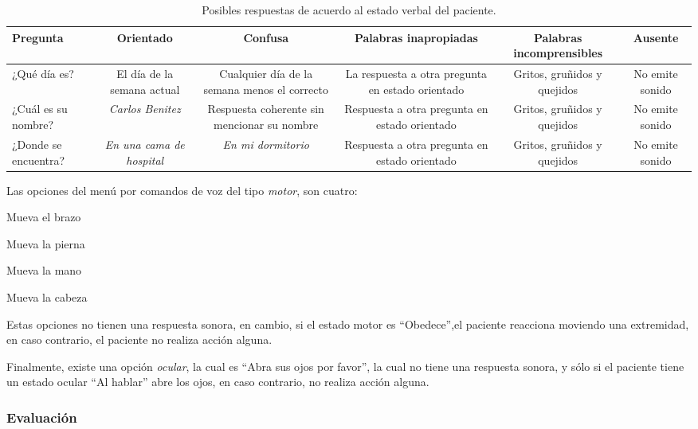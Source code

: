 \begin{itemize}
\begin{table}[H]
\centering
\begin{tabulary}{\textwidth}{LCCCCC}
\toprule
\textbf{Pregunta} & \textbf{Orientado} & \textbf{Confusa} & \textbf{Palabras
    inapropiadas} & \textbf{Palabras incomprensibles} & \textbf{Ausente} \\
\midrule
¿Qué día es? & El día de la semana actual & Cualquier día de la semana menos el
correcto & La respuesta a otra pregunta en estado orientado & Gritos, gruñidos y
quejidos & No emite sonido \\
¿Cuál es su nombre? & \emph{Carlos Benitez} & Respuesta coherente sin mencionar
su nombre & Respuesta a otra pregunta en estado orientado & Gritos, gruñidos y
quejidos & No emite sonido \\
¿Donde se encuentra? & \emph{En una cama de hospital} & \emph{En mi dormitorio} &
Respuesta a otra pregunta en estado orientado & Gritos, gruñidos y quejidos & No
emite sonido \\
\bottomrule
\end{tabulary}
\caption{Posibles respuestas de acuerdo al estado verbal del paciente.}
\label{tab:glasgow_opciones_respuesta}
\end{table}

Las opciones del menú por comandos de voz del tipo \emph{motor}, son cuatro: 

\begin{itemize*}
    \item Mueva el brazo
    \item Mueva la pierna
    \item Mueva la mano
    \item Mueva la cabeza
\end{itemize*}

Estas opciones no tienen una respuesta sonora, en cambio, si el estado motor es
\enquote{Obedece},el paciente reacciona moviendo una extremidad, en caso
contrario, el paciente no realiza acción alguna.

Finalmente, existe una opción \emph{ocular}, la cual es \enquote{Abra sus ojos por
favor}, la cual no tiene una respuesta sonora, y sólo si el paciente tiene un
estado ocular \enquote{Al hablar} abre los ojos, en caso contrario, no realiza
acción alguna.

\end{itemize}

\subsubsection{Evaluación}
\label{sec:puntuacion_glasgow}

